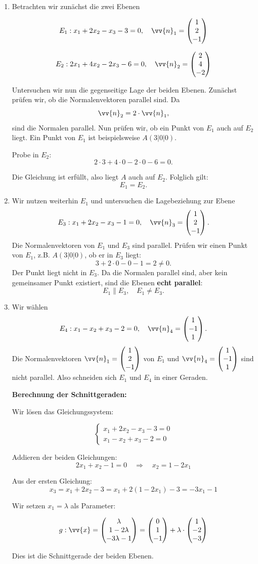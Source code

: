 \documentclass[ngerman, 12pt]{nssheetxea}
\begin{document}
\begin{example} \ 
\begin{enumerate}

\item Betrachten wir zunächst die zwei Ebenen

\[
E_1: x_1 + 2x_2 - x_3 - 3 = 0, \quad \vv{n}_1 = \colvec[1]{2}{-1}
\]

\[
E_2: 2x_1 + 4x_2 - 2x_3 - 6 = 0, \quad \vv{n}_2 = \colvec[2]{4}{-2}
\]

Untersuchen wir nun die gegenseitige Lage der beiden Ebenen. Zunächst prüfen wir, ob die Normalenvektoren parallel sind.  
Da 
\[
\vv{n}_2 = 2 \cdot \vv{n}_1,
\]
sind die Normalen parallel. Nun prüfen wir, ob ein Punkt von $E_1$ auch auf $E_2$ liegt.  
Ein Punkt von $E_1$ ist beispielsweise $A(3|0|0)$.

Probe in $E_2$:
\[
2\cdot 3 + 4 \cdot 0 -2 \cdot 0 - 6 = 0.
\]

Die Gleichung ist erfüllt, also liegt $A$ auch auf $E_2$.  
Folglich gilt:
\[
E_1 = E_2.
\]
\item Wir nutzen weiterhin $E_1$ und untersuchen die Lagebeziehung zur Ebene
\[
E_3: x_1 + 2x_2 - x_3 - 1 = 0, \quad \vv{n}_3 = \colvec[1]{2}{-1}.
\]
Die Normalenvektoren von $E_1$ und $E_3$ sind parallel.  
Prüfen wir einen Punkt von $E_1$, z.B. $A(3|0|0)$, ob er in $E_3$ liegt:
\[
3 + 2\cdot 0 - 0 - 1 = 2 \neq 0.
\]
Der Punkt liegt nicht in $E_3$.  
Da die Normalen parallel sind, aber kein gemeinsamer Punkt existiert, sind die Ebenen \textbf{echt parallel}:
\[
E_1 \parallel E_3, \quad E_1 \neq E_3.
\]

\item Wir wählen
\[
E_4: x_1 - x_2 + x_3 - 2 = 0, \quad \vv{n}_4 = \colvec[1]{-1}{1}.
\]
Die Normalenvektoren $\vv{n}_1 = \colvec[1]{2}{-1}$ von $E_1$ und $\vv{n}_4 = \colvec[1]{-1}{1}$ sind nicht parallel.  
Also schneiden sich $E_1$ und $E_4$ in einer Geraden.

\medskip
\textbf{Berechnung der Schnittgeraden:}

Wir lösen das Gleichungssystem:

\[
\begin{cases}
x_1 + 2x_2 - x_3 -3 = 0\\
x_1 - x_2 + x_3 -2 = 0
\end{cases}
\]

Addieren der beiden Gleichungen:
\[
2x_1 + x_2 -1 =0 \quad \Rightarrow \quad x_2 = 1 - 2x_1
\]

Aus der ersten Gleichung:
\[
x_3 = x_1 + 2x_2 -3 = x_1 + 2(1-2x_1) -3 = -3x_1 -1
\]

Wir setzen $x_1 = \lambda$ als Parameter:

\[
g:\vv{x} = \colvec[\lambda]{1-2\lambda}{-3\lambda-1} = \colvec[0]{1}{-1}+ \lambda \cdot \colvec[1]{-2}{-3}
\]

Dies ist die Schnittgerade der beiden Ebenen.

\end{enumerate}
\end{example}
\end{document}
